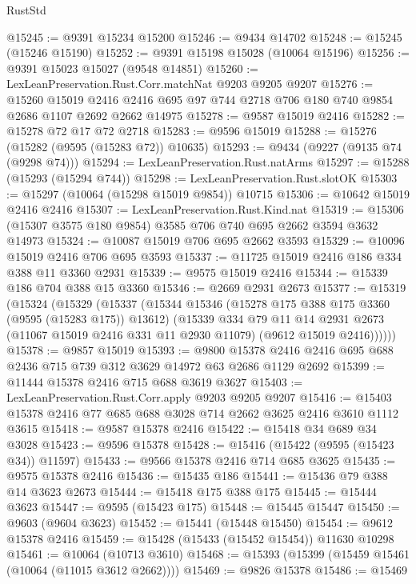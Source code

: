 \begin{lexlean}{RustStd}
\begin{coremodule}
@15245 := @9391 @15234 @15200
@15246 := @9434 @14702
@15248 := @15245 (@15246 @15190)
@15252 := @9391 @15198 @15028 (@10064 @15196)
@15256 := @9391 @15023 @15027 (@9548 @14851)
@15260 := LexLeanPreservation.Rust.Corr.matchNat @9203 @9205 @9207
@15276 := @15260
    @15019
    @2416
    @2416
    @695
    @97
    @744
    @2718
    @706
    @180
    @740
    @9854
    @2686
    @1107
    @2692
    @2662
    @14975
@15278 := @9587 @15019 @2416
@15282 := @15278 @72 @17 @72 @2718
@15283 := @9596 @15019
@15288 := @15276 (@15282 (@9595 (@15283 @72)) @10635)
@15293 := @9434 (@9227 (@9135 @74 (@9298 @74)))
@15294 := LexLeanPreservation.Rust.natArms
@15297 := @15288 (@15293 (@15294 @744))
@15298 := LexLeanPreservation.Rust.slotOK
@15303 := @15297 (@10064 (@15298 @15019 @9854)) @10715
@15306 := @10642 @15019 @2416 @2416
@15307 := LexLeanPreservation.Rust.Kind.nat
@15319 := @15306 (@15307 @3575 @180 @9854) @3585 @706 @740 @695 @2662 @3594 @3632 @14973
@15324 := @10087 @15019 @706 @695 @2662 @3593
@15329 := @10096 @15019 @2416 @706 @695 @3593
@15337 := @11725 @15019 @2416 @186 @334 @388 @11 @3360 @2931
@15339 := @9575 @15019 @2416
@15344 := @15339 @186 @704 @388 @15 @3360
@15346 := @2669 @2931 @2673
@15377 := @15319
    (@15324
      (@15329
        (@15337
          (@15344
            @15346
            (@15278 @175 @388 @175 @3360 (@9595 (@15283 @175)) @13612)
            (@15339
              @334
              @79
              @11
              @14
              @2931
              @2673
              (@11067 @15019 @2416 @331 @11 @2930 @11079)
              (@9612 @15019 @2416))))))
@15378 := @9857 @15019
@15393 := @9800 @15378 @2416 @2416 @695 @688 @2436 @715 @739 @312 @3629 @14972 @63 @2686 @1129 @2692
@15399 := @11444 @15378 @2416 @715 @688 @3619 @3627
@15403 := LexLeanPreservation.Rust.Corr.apply @9203 @9205 @9207
@15416 := @15403 @15378 @2416 @77 @685 @688 @3028 @714 @2662 @3625 @2416 @3610 @1112 @3615
@15418 := @9587 @15378 @2416
@15422 := @15418 @34 @689 @34 @3028
@15423 := @9596 @15378
@15428 := @15416 (@15422 (@9595 (@15423 @34)) @11597)
@15433 := @9566 @15378 @2416 @714 @685 @3625
@15435 := @9575 @15378 @2416
@15436 := @15435 @186
@15441 := @15436 @79 @388 @14 @3623 @2673
@15444 := @15418 @175 @388 @175
@15445 := @15444 @3623
@15447 := @9595 (@15423 @175)
@15448 := @15445 @15447
@15450 := @9603 (@9604 @3623)
@15452 := @15441 (@15448 @15450)
@15454 := @9612 @15378 @2416
@15459 := @15428 (@15433 (@15452 @15454)) @11630 @10298
@15461 := @10064 (@10713 @3610)
@15468 := @15393 (@15399 (@15459 @15461 (@10064 (@11015 @3612 @2662))))
@15469 := @9826 @15378
@15486 := @15469

\end{coremodule}
\end{lexlean}
